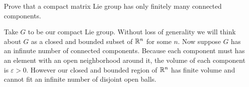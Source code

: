 \documentclass[
	pages,
	boxes,
	color=WildStrawberry
]{homework}
\begin{document}
\begin{problem}
Prove that a compact matrix Lie group has only finitely many connected components.
\end{problem}

\begin{solution}
	Take $G$ to be our compact Lie group. Without loss of generality we will think about $G$ as a closed and bounded subset of $\mathbb{R}^n$ for some $n$. Now suppose $G$ has an infinute number of connected components. Because each component must has an element with an open neighborhood around it, the volume of each component is $\varepsilon > 0$. However our closed and bounded region of $\mathbb{R}^n$ has finite volume and cannot fit an infinite number of disjoint open balls.
\end{solution}
\end{document}
